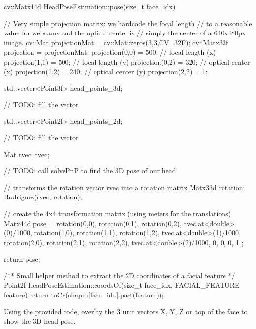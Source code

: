 \documentclass{instructions}
\begin{document}
\begin{cppcode}

cv::Matx44d HeadPoseEstimation::pose(size_t face_idx)
{

    // Very simple projection matrix: we hardcode the focal length
    // to a reasonable value for webcams and the optical center is
    // simply the center of a 640x480px image.
    cv::Mat projectionMat = cv::Mat::zeros(3,3,CV_32F);
    cv::Matx33f projection = projectionMat;
    projection(0,0) = 500; // focal length (x)
    projection(1,1) = 500; // focal length (y)
    projection(0,2) = 320; // optical center (x)
    projection(1,2) = 240; // optical center (y)
    projection(2,2) = 1;

    std::vector<Point3f> head_points_3d;

    // TODO: fill the vector

    std::vector<Point2f> head_points_2d;

    // TODO: fill the vector

    Mat rvec, tvec;

    // TODO: call solvePnP to find the 3D pose of our head

    // transforms the rotation vector rvec into a rotation matrix
    Matx33d rotation;
    Rodrigues(rvec, rotation);


    // create the 4x4 transformation matrix (using meters for the translations)
    Matx44d pose = {
        rotation(0,0),    rotation(0,1),    rotation(0,2),    tvec.at<double>(0)/1000,
        rotation(1,0),    rotation(1,1),    rotation(1,2),    tvec.at<double>(1)/1000,
        rotation(2,0),    rotation(2,1),    rotation(2,2),    tvec.at<double>(2)/1000,
                    0,                0,                0,                          1
    };

    return pose;
}

/** Small helper method to extract the 2D coordinates of a facial feature
 */
Point2f HeadPoseEstimation::coordsOf(size_t face_idx, FACIAL_FEATURE feature)
{
    return toCv(shapes[face_idx].part(feature));
}

\end{cppcode}


Using the provided code, overlay the 3 unit vectors X, Y, Z on top of the face
to show the 3D head pose.
\end{document}
